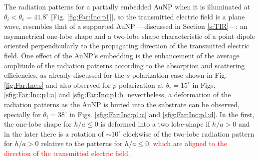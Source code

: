 The radiation patterns for a partially embedded AuNP when it is illuminated at $\theta_i < \theta_c = 41.8^\circ$ [Fig. \ref{fig:Far:Inc:p1}], so the transmitted electric field is a plane wave,  resembles  that of a supported AuNP ---discussed in Section \ref{s:TIR}---: an asymmetrical one-lobe shape and a two-lobe shape characteristic of a point dipole oriented perpendicularly to the propagating direction of the transmitted electric field. One effect of the AuNP's embedding is the enhancement of the average amplitude of the radiation patterns according to the absorption and scattering efficiencies, as already discussed for the $s$ polarization case shown in Fig. \ref{fig:Far:Inc:s} and also observed  for $p$ polarization at $\theta_i = 15^\circ$ in Figs. \ref{sfig:Far:Inc:p1:a} and \ref{sfig:Far:Inc:p1:b} nevertheless, a deformation of the radiation patterns as the AuNP is buried into the substrate can be observed, specially for $\theta_i = 38^\circ$ in Figs. \ref{sfig:Far:Inc:p1:c} and \ref{sfig:Far:Inc:p1:d}. In the first, the one-lobe shape for $h/a\leq 0$ is deformed into a two lobe-shape if $h/a>0$  and in the later there is a rotation of $\sim 10^\circ$ clockwise of the two-lobe radiation pattern for $h/a>0$ relative to the patterns for $h/a\leq0$, \textcolor{red}{which are aligned to the direction of the transmitted electric field.}

